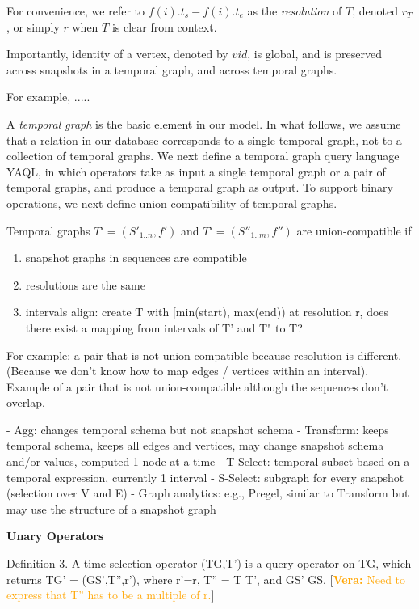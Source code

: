 \documentclass[10pt]{article}
\newcommand*{\ql}{YAQL\xspace}
\newcommand{\vera}[1]{[\textcolor{orange}{{\bf Vera: }#1}]}
\begin{document}
\begin{itemize}
For convenience, we refer to $ f(i).t_s - f(i).t_e$ as the {\em
  resolution} of $T$, denoted $r_T$, or simply $r$ when $T$ is clear
from context.

Importantly, identity of a vertex, denoted by $vid$, is global, and is
preserved across snapshots in a temporal graph, and across temporal
graphs.

For example, ..... 

A {\em temporal graph} is the basic element in our model.  In what
follows, we assume that a relation in our database corresponds to a
single temporal graph, not to a collection of temporal graphs.  We
next define a temporal graph query language \ql, in which operators
take as input a single temporal graph or a pair of temporal graphs,
and produce a temporal graph as output.  To support binary operations,
we next define union compatibility of temporal graphs.

\begin{definition}
\label{def:tuc}
Temporal graphs $T' = (S'_{1..n}, f')$ and $T' = (S''_{1..m}, f'')$ are
union-compatible if
\begin{enumerate}
\item snapshot graphs in sequences are compatible
\item resolutions are the same
\item intervals align: create T with [min(start), max(end)) at
  resolution r, does there exist a mapping from intervals of T' and T"
  to T?
\end{enumerate}
\end{definition}

For example: a pair that is not union-compatible because resolution is
different. (Because we don't know how to map edges / vertices within
an interval).  Example of a pair that is not union-compatible although
the sequences don't overlap.

- Agg: changes temporal schema but not snapshot schema
- Transform: keeps temporal schema, keeps all edges and vertices, may change snapshot schema and/or values, computed 1 node at a time
- T-Select: temporal subset based on a temporal expression, currently 1 interval
- S-Select: subgraph for every snapshot (selection over V and E) 
- Graph analytics: e.g., Pregel, similar to Transform but may use the structure of a snapshot graph

{\bf Unary Operators}

Definition 3. A time selection operator \sigma(TG,T') is a query operator on TG, which returns TG' = (GS',T'',r'), where r'=r, T'' = T \cap T', and GS' \subseteq GS. \vera{Need to express that T'' has to be a multiple of r.}


\end{itemize}
\end{document}
